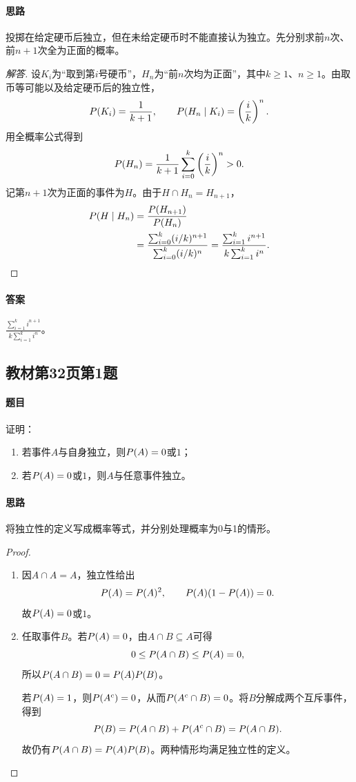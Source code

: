 \paragraph{思路}投掷在给定硬币后独立，但在未给定硬币时不能直接认为独立。先分别求前$n$次、前$n+1$次全为正面的概率。
\begin{proof}[解答]
设$K_i$为“取到第$i$号硬币”，$H_n$为“前$n$次均为正面”，其中$k\geq1$、$n\geq1$。由取币等可能以及给定硬币后的独立性，
\[
\P(K_i)=\frac1{k+1},\qquad \P(H_n\mid K_i)=\left(\frac ik\right)^n.
\]
用全概率公式得到
\[
\P(H_n)=\frac1{k+1}\sum_{i=0}^k\left(\frac ik\right)^n>0.
\]
记第$n+1$次为正面的事件为$H$。由于$H\cap H_n=H_{n+1}$，
\begin{align*}
\P(H\mid H_n)
&=\frac{\P(H_{n+1})}{\P(H_n)}\\
&=\frac{\sum_{i=0}^k(i/k)^{n+1}}{\sum_{i=0}^k(i/k)^n}
=\frac{\sum_{i=1}^ki^{n+1}}{k\sum_{i=1}^ki^n}.
\end{align*}
\end{proof}
\paragraph{答案}$\displaystyle\frac{\sum_{i=1}^ki^{n+1}}{k\sum_{i=1}^ki^n}$。

\subsection{教材第32页第1题}
\label{ex:w04-t32-1}
\paragraph{题目}
证明：
\begin{enumerate}
\item 若事件$A$与自身独立，则$\P(A)=0$或$1$；
\item 若$\P(A)=0$或$1$，则$A$与任意事件独立。
\end{enumerate}
\paragraph{思路}将独立性的定义写成概率等式，并分别处理概率为0与1的情形。
\begin{proof}
\begin{enumerate}
\item 因$A\cap A=A$，独立性给出
\[
\P(A)=\P(A)^2,\qquad \P(A)(1-\P(A))=0.
\]
故$\P(A)=0$或$1$。
\item 任取事件$B$。若$\P(A)=0$，由$A\cap B\subseteq A$可得
\[
0\leq\P(A\cap B)\leq\P(A)=0,
\]
所以$\P(A\cap B)=0=\P(A)\P(B)$。

若$\P(A)=1$，则$\P(A^c)=0$，从而$\P(A^c\cap B)=0$。将$B$分解成两个互斥事件，得到
\[
\P(B)=\P(A\cap B)+\P(A^c\cap B)=\P(A\cap B).
\]
故仍有$\P(A\cap B)=\P(A)\P(B)$。两种情形均满足独立性的定义。
\end{enumerate}
\end{proof}
